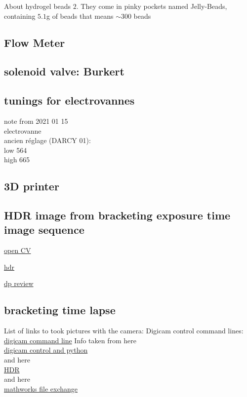 \documentclass[lineno]{jfm}
\begin{document}
About hydrogel beads $2$. They come in pinky pockets named Jelly-Beads, containing $5.1$g of beads that means $\sim300$ beads
\subsection{Flow Meter}

\subsection{solenoid valve: Burkert}

\subsection{tunings for electrovannes}

note from 2021 01 15\\
electrovanne\\
ancien réglage (DARCY 01):\\
low  564 \\
high 665\\


\subsection{3D printer}

\subsection{HDR image from bracketing exposure time image sequence}


\href{https://docs.opencv.org/master/d3/db7/tutorial_hdr_imaging.html}{open CV}


\href{https://towardsdatascience.com/hdr-imaging-what-is-an-hdr-image-anyway-bdf05985492c}{hdr}

\href{https://www.dpreview.com/articles/9828658229/computational-photography-part-i-what-is-computational-photography/2}{dp review}

\subsection{bracketing time lapse}

List of links to took pictures with the camera:
Digicam control command lines: \href{http://digicamcontrol.com/doc/userguide/cmd }{digicam command line}
Info taken from here\\ \href{https://stackoverflow.com/questions/43358257/using-digicamcontrol-to-control-nikon-camera-using-python}{digicam control and python} \\ 
and here \\
\href{http://www.pauldebevec.com/Research/HDR/}{HDR}  \\
and here\\
\href{https://fr.mathworks.com/matlabcentral/fileexchange/57196-cameracontroller?s_tid=FX_rc3_behav}{mathworks file exchange} \\
\end{document}
